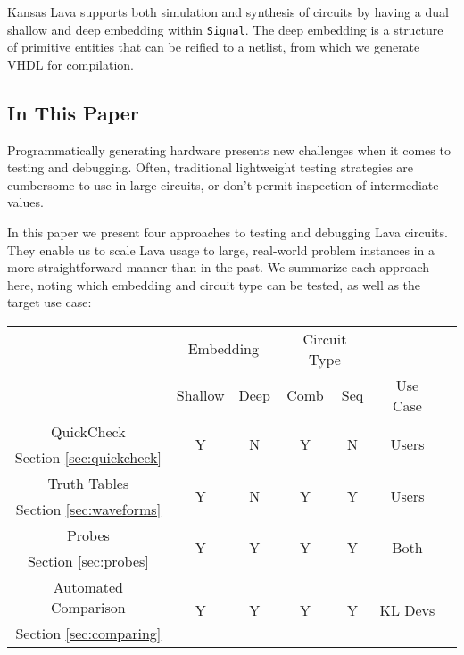 \documentclass{llncs}
\begin{document}
Kansas Lava supports both simulation and synthesis of circuits by having a dual
shallow and deep embedding within \verb!Signal!. The deep embedding is a
structure of primitive entities that can be reified to a netlist, from which
we generate VHDL for compilation.

\subsection{In This Paper}

Programmatically generating hardware presents new challenges when it comes
to testing and debugging. Often, traditional lightweight testing strategies
are cumbersome to use in large circuits, or don't permit inspection of
intermediate values.

In this paper we present four approaches to testing and debugging
Lava circuits. They enable us to scale Lava usage to large, real-world
problem instances in a more straightforward manner than in the past.
We summarize each approach here, noting which embedding and
circuit type can be tested, as well as the target use case:

\begin{center}
\label{table:approaches}
\begin{tabular}{l | c | c | c | c | c | c |}
\cline{2-5}
& \multicolumn{2}{|c|}{Embedding}
& \multicolumn{2}{c|}{Circuit Type}
& \multicolumn{1}{|c}{}\\
\cline{2-6}
 & Shallow & Deep & Comb & Seq & Use Case \\
\hline
\multicolumn{1}{|c|}{QuickCheck} & \multirow{2}{*}{Y} & \multirow{2}{*}{N} & \multirow{2}{*}{Y} & \multirow{2}{*}{N} & \multirow{2}{*}{Users} \\
\multicolumn{1}{|c|}{\footnotesize{Section \ref{sec:quickcheck}}} & & & & & \\
\hline
\multicolumn{1}{|c|}{Truth Tables} & \multirow{2}{*}{Y} & \multirow{2}{*}{N} & \multirow{2}{*}{Y} & \multirow{2}{*}{Y} & \multirow{2}{*}{Users} \\
\multicolumn{1}{|c|}{\footnotesize{Section \ref{sec:waveforms}}} & & & & & \\
\hline
\multicolumn{1}{|c|}{Probes} & \multirow{2}{*}{Y} & \multirow{2}{*}{Y} & \multirow{2}{*}{Y} & \multirow{2}{*}{Y} & \multirow{2}{*}{Both} \\
\multicolumn{1}{|c|}{\footnotesize{Section \ref{sec:probes}}} & & & & & \\
\hline
\multicolumn{1}{|c|}{Automated Comparison} & \multirow{2}{*}{Y} & \multirow{2}{*}{Y} & \multirow{2}{*}{Y} & \multirow{2}{*}{Y} & \multirow{2}{*}{KL Devs} \\
\multicolumn{1}{|c|}{\footnotesize{Section \ref{sec:comparing}}} & & & & & \\
\hline
\end{tabular}


\end{center}
\end{document}
